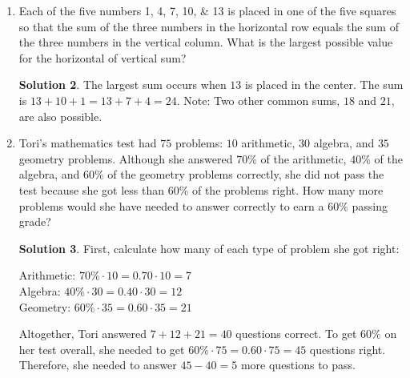 \documentclass{article}
\theoremstyle{definition}
\newtheorem*{solution}{Solution}
\begin{document}
\begin{multicols}{2}
\begin{enumerate}
\begin{solution}
            \end{solution}
        \item Each of the five numbers \numlist{1;4;7;10;13} is placed in one of the five squares so that the sum of the three numbers in the horizontal row equals the sum of the three numbers in the vertical column.
            What is the largest possible value for the horizontal of vertical sum?
            \begin{center}
            \end{center}
            \begin{solution}
                The largest sum occurs when $13$ is placed in the center.
                The sum is $13 + 10 + 1 = 13 + 7 + 4 = 24$.
                Note: Two other common sums, $18$ and $21$, are also possible.
            \end{solution}
        \item Tori's mathematics test had $75$ problems: $10$ arithmetic, $30$ algebra, and $35$ geometry problems.
            Although she answered $70\%$ of the arithmetic, $40\%$ of the algebra, and $60\%$ of the geometry problems correctly, she did not pass the test because she got less than $60\%$ of the problems right.
            How many more problems would she have needed to answer correctly to earn a $60\%$ passing grade?
            \begin{solution}
                First, calculate how many of each type of problem she got right:
                \begin{displayquote}
                    Arithmetic: $70\% \cdot 10 = 0.70 \cdot 10 = 7$ \\
                    Algebra: $40\% \cdot 30 = 0.40 \cdot 30 = 12$ \\
                    Geometry: $60\% \cdot 35 = 0.60 \cdot 35 = 21$
                \end{displayquote}
                Altogether, Tori answered $7 + 12 + 21 = 40$ questions correct.
                To get $60\%$ on her test overall, she needed to get $60\% \cdot 75 = 0.60 \cdot 75 = 45$ questions right.
                Therefore, she needed to answer $45 - 40 = 5$ more questions to pass.
            \end{solution}
    \end{enumerate}
\end{multicols}
\end{document}
